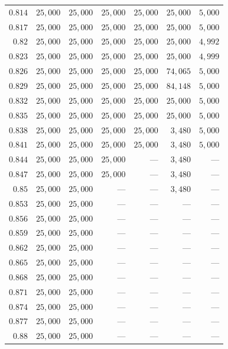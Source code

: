 \begin{singlespace}
\begin{longtable}{@{}rrrrrrr@{}}
$0.814$ & $25{,}000$ & $25{,}000$ & $25{,}000$ & $25{,}000$ & $25{,}000$ & $5{,}000$ \\
$0.817$ & $25{,}000$ & $25{,}000$ & $25{,}000$ & $25{,}000$ & $25{,}000$ & $5{,}000$ \\
$0.82$ & $25{,}000$ & $25{,}000$ & $25{,}000$ & $25{,}000$ & $25{,}000$ & $4{,}992$ \\
$0.823$ & $25{,}000$ & $25{,}000$ & $25{,}000$ & $25{,}000$ & $25{,}000$ & $4{,}999$ \\
$0.826$ & $25{,}000$ & $25{,}000$ & $25{,}000$ & $25{,}000$ & $74{,}065$ & $5{,}000$ \\
$0.829$ & $25{,}000$ & $25{,}000$ & $25{,}000$ & $25{,}000$ & $84{,}148$ & $5{,}000$ \\
$0.832$ & $25{,}000$ & $25{,}000$ & $25{,}000$ & $25{,}000$ & $25{,}000$ & $5{,}000$ \\
$0.835$ & $25{,}000$ & $25{,}000$ & $25{,}000$ & $25{,}000$ & $25{,}000$ & $5{,}000$ \\
$0.838$ & $25{,}000$ & $25{,}000$ & $25{,}000$ & $25{,}000$ & $3{,}480$ & $5{,}000$ \\
$0.841$ & $25{,}000$ & $25{,}000$ & $25{,}000$ & $25{,}000$ & $3{,}480$ & $5{,}000$ \\
$0.844$ & $25{,}000$ & $25{,}000$ & $25{,}000$ & --- & $3{,}480$ & --- \\
$0.847$ & $25{,}000$ & $25{,}000$ & $25{,}000$ & --- & $3{,}480$ & --- \\
$0.85$ & $25{,}000$ & $25{,}000$ & --- & --- & $3{,}480$ & --- \\
$0.853$ & $25{,}000$ & $25{,}000$ & --- & --- & --- & --- \\
$0.856$ & $25{,}000$ & $25{,}000$ & --- & --- & --- & --- \\
$0.859$ & $25{,}000$ & $25{,}000$ & --- & --- & --- & --- \\
$0.862$ & $25{,}000$ & $25{,}000$ & --- & --- & --- & --- \\
$0.865$ & $25{,}000$ & $25{,}000$ & --- & --- & --- & --- \\
$0.868$ & $25{,}000$ & $25{,}000$ & --- & --- & --- & --- \\
$0.871$ & $25{,}000$ & $25{,}000$ & --- & --- & --- & --- \\
$0.874$ & $25{,}000$ & $25{,}000$ & --- & --- & --- & --- \\
$0.877$ & $25{,}000$ & $25{,}000$ & --- & --- & --- & --- \\
$0.88$ & $25{,}000$ & $25{,}000$ & --- & --- & --- & --- \\
\end{longtable}
\end{singlespace}
\endgroup

